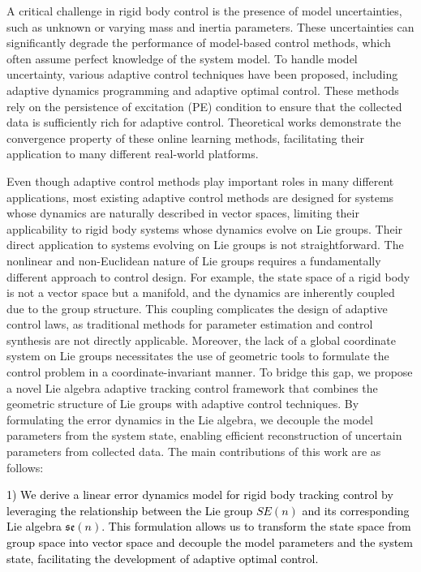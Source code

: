 \documentclass[lettersize,journal]{IEEEtran}
\begin{document}
A critical challenge in rigid body control is the presence of model uncertainties, such as unknown or varying mass and inertia parameters. These uncertainties can significantly degrade the performance of model-based control methods, which often assume perfect knowledge of the system model. To handle model uncertainty, various adaptive control techniques have been proposed, including adaptive dynamics programming and adaptive optimal control. These methods rely on the persistence of excitation (PE) condition to ensure that the collected data is sufficiently rich for adaptive control. Theoretical works\cite{dean2018regret,frank-tnnls} demonstrate the convergence property of these online learning methods, facilitating their application to many different real-world platforms\cite{9497675,CHAKRABORTY2024103026,yang2022hierarchical}.


Even though adaptive control methods play important roles in many different applications, most existing adaptive control methods are designed for systems whose dynamics are naturally described in vector spaces, limiting their applicability to rigid body systems whose dynamics evolve on Lie groups. Their direct application to systems evolving on Lie groups is not straightforward. The nonlinear and non-Euclidean nature of Lie groups requires a fundamentally different approach to control design. For example, the state space of a rigid body is not a vector space but a manifold, and the dynamics are inherently coupled due to the group structure. This coupling complicates the design of adaptive control laws, as traditional methods for parameter estimation and control synthesis are not directly applicable. Moreover, the lack of a global coordinate system on Lie groups necessitates the use of geometric tools to formulate the control problem in a coordinate-invariant manner. To bridge this gap, we propose a novel Lie algebra adaptive tracking control framework that combines the geometric structure of Lie groups with adaptive control techniques. By formulating the error dynamics in the Lie algebra, we decouple the model parameters from the system state, enabling efficient reconstruction of uncertain parameters from collected data. The main contributions of this work are as follows:

\textcolor{black}{1) We derive a linear error dynamics model for rigid body tracking control by leveraging the relationship between the Lie group $SE(n)$ and its corresponding Lie algebra $\mathfrak{se}(n)$. This formulation allows us to transform the state space from group space into vector space and decouple the model parameters and the system state, facilitating the development of adaptive optimal control.}
\end{document}
